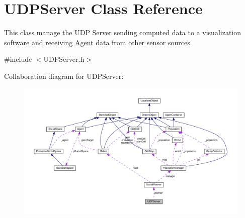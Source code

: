 \hypertarget{classUDPServer}{}\section{U\+D\+P\+Server Class Reference}
\label{classUDPServer}


This class manage the U\+DP Server sending computed data to a visualization software and receiving \hyperlink{classAgent}{Agent} data from other sensor sources.  




{\ttfamily \#include $<$U\+D\+P\+Server.\+h$>$}



Collaboration diagram for U\+D\+P\+Server\+:\nopagebreak
\begin{figure}[H]
\begin{center}
\leavevmode
\includegraphics[width=350pt]{classUDPServer__coll__graph}
\end{center}
\end{figure}
